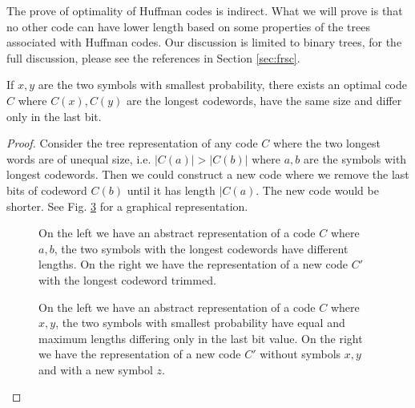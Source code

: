 The prove of optimality of Huffman codes is indirect. What we will prove is that no other code can have lower length based on some properties of the trees associated with Huffman codes. Our discussion is limited to binary trees, for the full discussion, please see the references in Section \ref{sec:frsc}.

\begin{lemma}
If $x,y$ are the two symbols with smallest probability, there exists an optimal code $C$ where $C\left(x\right),C(y)$ are the longest codewords, have the same size and differ only in the last bit.
\end{lemma}
\begin{proof}
Consider the tree representation of any code $C$ where the two longest words are of unequal size, i.e. $|C(a)|>|C(b)|$ where $a,b$ are the symbols with longest codewords. Then we could construct a new code where we remove the last bits of codeword $C(b)$ until it has length $|C(a)$. The new code would be shorter. See Fig. \ref{fig:huff1} for a graphical representation.
\begin{figure}
\begin{subfigure}{.5\textwidth}
  
  \caption{} \label{fig:hfig1}
\end{subfigure}%
\begin{subfigure}{.5\textwidth}
  
  \caption{} \label{fig:hfig2}
\end{subfigure}
\caption{On the left we have an abstract representation of a code $C$ where $a,b$, the two symbols with the longest codewords have different lengths. On the right we have the representation of a new code $C'$ with the longest codeword trimmed.}\label{fig:huff1}
\end{figure}
\begin{figure}
\begin{subfigure}{.5\textwidth}
  
  \caption{} \label{fig:hfig3}
\end{subfigure}%
\begin{subfigure}{.5\textwidth}
  
  \caption{} \label{fig:hfig4}
\end{subfigure}
\caption{On the left we have an abstract representation of a code $C$ where $x,y$, the two symbols with smallest probability have equal and maximum lengths differing only in the last bit value. On the right we have the representation of a new code $C'$ without symbols $x,y$ and with a new symbol $z$.}\label{fig:huff3}
\end{figure}

\end{proof}
